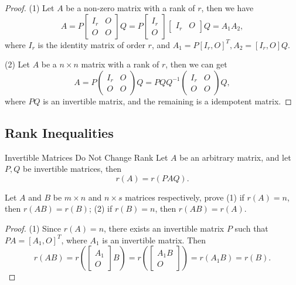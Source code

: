 \begin{proof}
  (1) Let $A$ be a non-zero matrix with a rank of $r$, then we have
  \begin{equation}
    A=P\begin{bmatrix}I_r&O\\O&O\end{bmatrix}Q=P\begin{bmatrix}I_r\\O\end{bmatrix}\begin{bmatrix}I_r&O\end{bmatrix}Q
    = A_1 A_2,
  \end{equation}
  where $I_r$ is the identity matrix of order $r$,
  and $A_1 = P [I_r, O]^T, A_2 = [I_r, O]Q$.

  (2) Let $A$ be a $n \times n$ matrix with a rank of $r$,
  then we can get
  \begin{equation}
    A=P\begin{pmatrix}I_r&O\\O&O\end{pmatrix}Q=PQQ^{-1}\begin{pmatrix}I_r&O\\O&O\end{pmatrix}Q,
  \end{equation}
  where $PQ$ is an invertible matrix, and the remaining is a idempotent matrix.
\end{proof}

\subsection{Rank Inequalities}

\begin{lemma}{Invertible Matrices Do Not Change Rank}{}
  Let $A$ be an arbitrary matrix,
  and let $P, Q$ be invertible matrices,
  then
  \begin{equation}
    r(A) = r(PAQ).
  \end{equation}
\end{lemma}

\begin{example}{}{}
  Let $A$ and $B$ be $m \times n$ and $n \times s$ matrices respectively,
  prove (1) if $r(A) = n$, then $r(AB) = r(B)$;
  (2) if $r(B) = n$, then $r(AB) = r(A)$.
\end{example}

\begin{proof}
  (1) Since $r(A) = n$, there exists an invertible matrix $P$ such that $PA =
  [A_1, O]^T$, where $A_1$ is an invertible matrix.
  Then
  \begin{equation}
    r(AB) = r \left(
      \begin{bmatrix}
        A_1\\
        O
      \end{bmatrix}B
    \right)
    = r\left(
      \begin{bmatrix}
        A_1 B\\
        O
      \end{bmatrix}
    \right) = r(A_1B) = r(B).
  \end{equation}
\end{proof}

